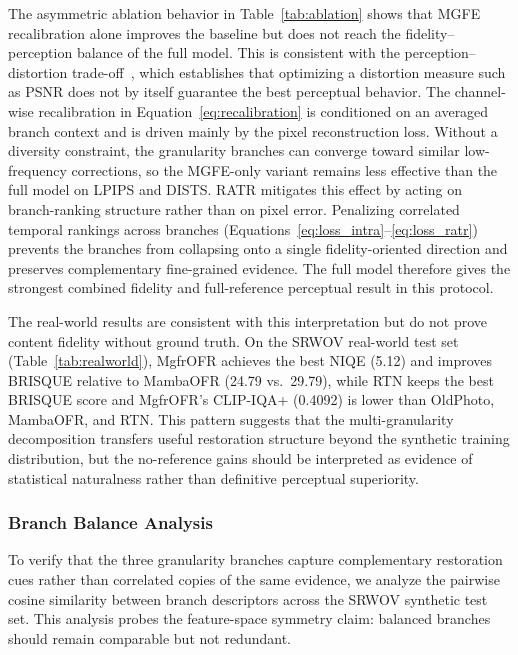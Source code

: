 The asymmetric ablation behavior in Table~\ref{tab:ablation} shows that MGFE recalibration alone improves the baseline but does not reach the fidelity--perception balance of the full model. This is consistent with the perception--distortion trade-off~\cite{blau2018perception}, which establishes that optimizing a distortion measure such as PSNR does not by itself guarantee the best perceptual behavior. The channel-wise recalibration in Equation~\eqref{eq:recalibration} is conditioned on an averaged branch context and is driven mainly by the pixel reconstruction loss. Without a diversity constraint, the granularity branches can converge toward similar low-frequency corrections, so the MGFE-only variant remains less effective than the full model on LPIPS and DISTS. RATR mitigates this effect by acting on branch-ranking structure rather than on pixel error. Penalizing correlated temporal rankings across branches (Equations~\eqref{eq:loss_intra}--\eqref{eq:loss_ratr}) prevents the branches from collapsing onto a single fidelity-oriented direction and preserves complementary fine-grained evidence. The full model therefore gives the strongest combined fidelity and full-reference perceptual result in this protocol.

The real-world results are consistent with this interpretation but do not prove content fidelity without ground truth. On the SRWOV real-world test set (Table~\ref{tab:realworld}), MgfrOFR achieves the best NIQE (5.12) and improves BRISQUE relative to MambaOFR (24.79 vs.\ 29.79), while RTN keeps the best BRISQUE score and MgfrOFR's CLIP-IQA+ (0.4092) is lower than OldPhoto, MambaOFR, and RTN. This pattern suggests that the multi-granularity decomposition transfers useful restoration structure beyond the synthetic training distribution, but the no-reference gains should be interpreted as evidence of statistical naturalness rather than definitive perceptual superiority.

\subsubsection{Branch Balance Analysis}
\label{subsec:branch_analysis}

To verify that the three granularity branches capture complementary restoration cues rather than correlated copies of the same evidence, we analyze the pairwise cosine similarity between branch descriptors across the SRWOV synthetic test set. This analysis probes the feature-space symmetry claim: balanced branches should remain comparable but not redundant.


